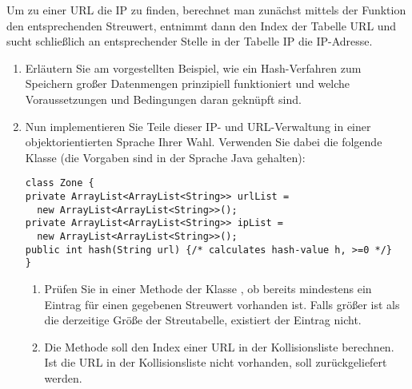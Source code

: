 \documentclass{lehramt-informatik-aufgabe}
\begin{document}
\noindent
Um zu einer URL die IP zu finden, berechnet man zunächst mittels der
Funktion  den entsprechenden Streuwert, entnimmt dann den
Index der Tabelle URL und sucht schließlich an entsprechender Stelle in
der Tabelle IP die IP-Adresse.

\begin{enumerate}


\item Erläutern Sie am vorgestellten Beispiel, wie ein Hash-Verfahren
zum Speichern großer Datenmengen prinzipiell funktioniert und welche
Voraussetzungen und Bedingungen daran geknüpft sind.


\item Nun implementieren Sie Teile dieser IP- und URL-Verwaltung in
einer objektorientierten Sprache Ihrer Wahl. Verwenden Sie dabei die
folgende Klasse (die Vorgaben sind in der Sprache Java gehalten):

\begin{verbatim}
class Zone {
private ArrayList<ArrayList<String>> urlList =
  new ArrayList<ArrayList<String>>();
private ArrayList<ArrayList<String>> ipList =
  new ArrayList<ArrayList<String>>();
public int hash(String url) {/* calculates hash-value h, >=0 */}
}
\end{verbatim}

\begin{enumerate}

\item Prüfen Sie in einer Methode  der
Klasse , ob bereits mindestens ein Eintrag für einen
gegebenen Streuwert vorhanden ist. Falls  größer ist als die
derzeitige Größe der Streutabelle, existiert der Eintrag nicht.

\begin{antwort}
\end{antwort}


\item Die Methode  soll den Index einer URL in der Kollisionsliste berechnen. Ist
die URL in der Kollisionsliste nicht vorhanden, soll 
zurückgeliefert werden.

\begin{antwort}
\end{antwort}


\end{enumerate}
\end{enumerate}
\end{document}
